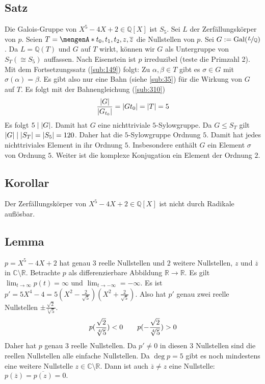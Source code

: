 \subsection[{Satz: Die Galois-Gruppe von $X^5- 4X+2 \in \mathds{Q}[X]$ ist $S_5$}]{Satz} %
\label{sub:227}
Die Galois-Gruppe von $X^5- 4X+2 \in \mathds{Q}[X]$ ist $S_5$.
Sei $L$ der Zerfällungskörper von $p$. Seien $T= \set{t_0, t_1, t_2, z, \overline{z} } $ die Nullstellen von $p$. Sei $G := \operatorname{Gal}(\nicefrac{L}{\mathbb{Q}})$. Da $L=\mathds{Q}(T)$ und $G$ auf $T$ wirkt, können wir $G$ als Untergruppe von
$S_T (\cong S_5)$ auffassen. Nach Eisenstein ist $p$ irreduzibel (teste die Primzahl 2). Mit dem Fortsetzungssatz (\ref{sub:149}) folgt: Zu $\alpha, \beta \in T$ gibt es
$\sigma \in G$ mit $\sigma(\alpha)=\beta$. Es gibt also nur eine Bahn (siehe \ref{sub:35}) für die Wirkung von $G$ auf $T$. Es folgt mit der Bahnengleichung (\ref{sub:310})
\[
	\frac{\lvert G\rvert }{\lvert G_{t_0}\rvert} = \lvert G t_0\rvert = \lvert T\rvert = 5  
\]
Es folgt $5 \mid \lvert G\rvert$. Damit hat $G$ eine nichttriviale $5$-Sylowgruppe. Da $G \le S_T$ gilt $\lvert G\rvert \mid \lvert S_T\rvert = \lvert S_5\rvert = 120 $. Daher hat die $5$-Sylowgruppe
Ordnung $5$. Damit hat jedes nichttriviales Element in ihr Ordnung $5$. Insbesondere enthält $G$ ein Element $\sigma$ von Ordnung $5$. Weiter ist die komplexe Konjugation
ein Element der Ordnung $2$.

\subsection[{Korollar: Der Zerfällungskörper von $X^5-4X +2 \in \mathds{Q}[X]$}]{Korollar} %
\label{sub:228}
Der Zerfällungskörper von $X^5-4X +2 \in \mathds{Q}[X]$ ist nicht durch Radikale auflösbar.

\subsection[Lemma: Nullstellen von $X^5- 4X +2$]{Lemma} %
\label{sub:229}
$p=X^5-4X+2$ hat genau $3$ reelle Nullstellen und $2$ weitere Nullstellen, $z$ und $\overline{z} $ in $\mathds{C} \setminus \mathds{R}$.
Betrachte $p$ als differenzierbare Abbildung $\mathds{R} \to \mathds{R}$. Es gilt $\lim_{ t \to \infty}p(t) = \infty $ und $\lim_{ t \to -\infty} = - \infty $.
Es ist $p' = 5 X^4 -4 = 5 (X^2- \frac{2}{\sqrt{5}  } ) (X^2+ \frac{2}{\sqrt{5}})$. Also hat $p'$ genau zwei reelle Nullstellen $\pm \frac{\sqrt{2}  }{\sqrt[4]{5}}$.
\[
	p (\frac{\sqrt{2}  }{\sqrt[4]{5}  } ) < 0 \qquad p ( - \frac{\sqrt{2}  }{\sqrt[4]{5}  } ) >0
\]
Daher hat $p$ genau $3$ reelle Nullstellen. Da $p' \not= 0$ in diesen $3$ Nullstellen sind die reellen Nullstellen alle einfache Nullstellen. Da $\deg p =5$ gibt es noch
mindestens eine weitere Nullstelle $z \in \mathds{C} \setminus \mathds{R}$. Dann ist auch $\overline{z} \not= z $ eine Nullstelle: $p(\overline{z} ) = \overline{p(z)} =0.$
\bewende

